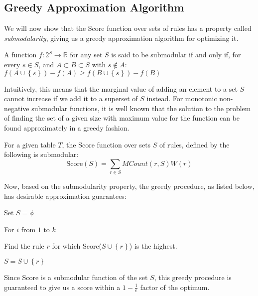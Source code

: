\subsection{Greedy Approximation Algorithm}\label{sec:greedy-approx}
 We will now show that the Score function over sets of rules has a property called {\em submodularity}, giving us a greedy approximation algorithm for optimizing it. 
\begin{definition}
A function $f: 2^S \rightarrow \mathbb{R}$ for any set $S$ is said to be submodular if and only if, for every $s \in S$, and $A \subset B \subset S$ with $s \notin A$: $f(A \cup \left\lbrace s \right\rbrace) - f(A) \geq f(B \cup \left\lbrace s \right\rbrace) - f(B)$
\end{definition}
Intuitively, this means that the marginal value of adding an element to a set $S$ cannot increase if we add it to a superset of $S$ instead. For monotonic non-negative submodular functions, it is well known that the solution to the problem of finding the set of a given size with maximum value for the function can be found approximately in a greedy fashion. 

\begin{lemma}\label{lemma:submodular}
For a given table $T$, the Score function over sets $S$ of rules, defined by the following is submodular:
$$\text{Score}(S) = \sum_{r \in S} MCount(r,S)W(r)$$
\end{lemma}
\vspace{-10pt}

 Now, based on the submodularity property, the greedy procedure,
as listed below, has desirable approximation guarantees:
\vspace{-5pt}
\begin{framed}
\vspace{-5pt}
\begin{denselist}
\item Set $S = \phi$
\item For $i$ from $1$ to $k$
\begin{denselist}
\item Find the rule $r$ for which Score($S \cup \left\lbrace r \right\rbrace$) is the highest.
\item $S = S \cup \left\lbrace r \right\rbrace$
\end{denselist}
\end{denselist}
\vspace{-5pt}
\end{framed}
\vspace{-5pt}
Since Score is a submodular function of the set $S$, 
this greedy procedure is guaranteed to give us a score within a $1 - \frac{1}{e}$ factor of the optimum. 

